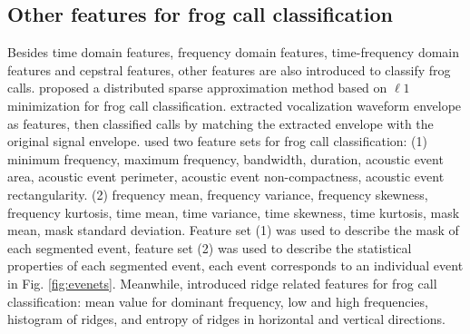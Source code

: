 \subsection{Other features for frog call classification}
Besides time domain features, frequency domain features, time-frequency domain features and cepstral features, other features are also introduced to classify frog calls.
\cite{wei2012distributed} proposed a distributed sparse approximation method based on $\ell 1$ minimization for frog call classification. \cite{dang2008lightweight} extracted vocalization waveform envelope as features, then classified calls by matching the extracted envelope with the original signal envelope.  \cite{emr2015Xie} used two feature sets for frog call classification: (1) minimum frequency, maximum frequency, bandwidth, duration, acoustic event area, acoustic event perimeter, acoustic event non-compactness, acoustic event rectangularity. (2) frequency mean, frequency variance, frequency skewness, frequency kurtosis, time mean, time variance, time skewness, time kurtosis, mask mean, mask standard deviation. Feature set (1) was used to describe the mask of each segmented event, feature set (2) was used to describe the statistical properties of each segmented event, each event corresponds to an individual event in 
Fig. \ref{fig:evenets}. Meanwhile, \cite{jie2015ICIP} introduced ridge related features for frog call classification: mean value for dominant frequency, low and high frequencies, histogram of ridges, and entropy of ridges in horizontal and vertical directions.




